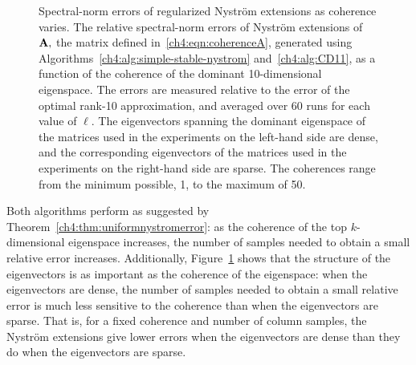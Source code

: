 \begin{figure}[htb!]
\centering



\caption[Spectral-norm errors of regularized Nystr\"om extensions as coherence varies]{%
{\sc Spectral-norm errors of regularized Nystr\"om extensions as coherence varies.} 
The relative spectral-norm errors of Nystr\"om extensions of $\mathbf{A},$
the matrix defined in~\eqref{ch4:eqn:coherenceA}, generated using
Algorithms~\ref{ch4:alg:simple-stable-nystrom} and~\ref{ch4:alg:CD11},
as a function of the coherence of the dominant
10-dimensional eigenspace. The errors are measured relative to the error of the
optimal rank-10 approximation, and averaged over 60 runs for each value of
$\ell.$ The eigenvectors spanning the dominant eigenspace of the matrices used
in the experiments on the left-hand side are dense, and the corresponding
eigenvectors of the matrices used in the experiments on the right-hand side are
sparse. The coherences range from the minimum possible, 1, to the maximum of
50.}
\label{ch4:fig:vary-coherence}
\end{figure}

Both algorithms perform as suggested by Theorem~\ref{ch4:thm:uniformnystromerror}: as the coherence of the top
$k$-dimensional eigenspace increases, the number of samples needed to obtain a small relative
error increases. Additionally, Figure~\ref{ch4:fig:vary-coherence} shows that the
structure of the eigenvectors is as important as the coherence of the
eigenspace: when the eigenvectors are dense, the number of samples needed to
obtain a small relative error is much less sensitive to the coherence than when
the eigenvectors are sparse. That is, for a fixed coherence and number of column
samples, the Nystr\"om extensions give lower errors when the eigenvectors are
dense than they do when the eigenvectors are sparse. 

